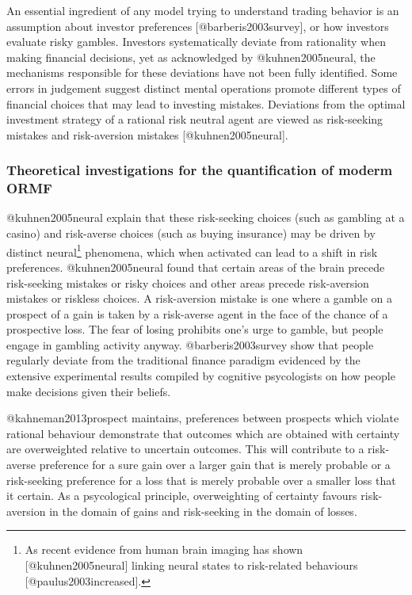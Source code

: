 \documentclass[]{article}
\let\rmarkdownfootnote\footnote%
\def\footnote{\protect\rmarkdownfootnote}
\begin{document}
An essential ingredient of any model trying to understand trading
behavior is an assumption about investor preferences
{[}@barberis2003survey{]}, or how investors evaluate risky gambles.
Investors systematically deviate from rationality when making financial
decisions, yet as acknowledged by @kuhnen2005neural, the mechanisms
responsible for these deviations have not been fully identified. Some
errors in judgement suggest distinct mental operations promote different
types of financial choices that may lead to investing mistakes.
Deviations from the optimal investment strategy of a rational risk
neutral agent are viewed as risk-seeking mistakes and risk-aversion
mistakes {[}@kuhnen2005neural{]}.\medskip 

\subsubsection{Theoretical investigations for the quantification of moderm ORMF}

@kuhnen2005neural explain that these risk-seeking choices (such as
gambling at a casino) and risk-averse choices (such as buying insurance)
may be driven by distinct
neural\footnote{As recent evidence from human brain imaging has shown [@kuhnen2005neural] linking neural states to risk-related behaviours [@paulus2003increased].}
phenomena, which when activated can lead to a shift in risk preferences.
@kuhnen2005neural found that certain areas of the brain precede
risk-seeking mistakes or risky choices and other areas precede
risk-aversion mistakes or riskless choices. A risk-aversion mistake is
one where a gamble on a prospect of a gain is taken by a risk-averse
agent in the face of the chance of a prospective loss. The fear of
losing prohibits one's urge to gamble, but people engage in gambling
activity anyway. @barberis2003survey show that people regularly deviate
from the traditional finance paradigm evidenced by the extensive
experimental results compiled by cognitive psycologists on how people
make decisions given their beliefs.\medskip 

@kahneman2013prospect maintains, preferences between prospects which
violate rational behaviour demonstrate that outcomes which are obtained
with certainty are overweighted relative to uncertain outcomes. This
will contribute to a risk-averse preference for a sure gain over a
larger gain that is merely probable or a risk-seeking preference for a
loss that is merely probable over a smaller loss that it certain. As a
psycological principle, overweighting of certainty favours risk-aversion
in the domain of gains and risk-seeking in the domain of losses.\medskip
\end{document}
